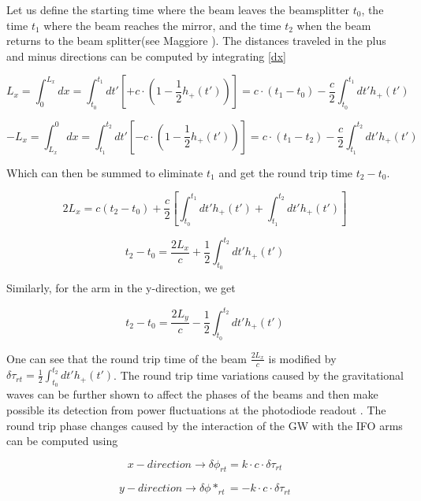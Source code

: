 Let us define the starting time where the beam leaves the beamsplitter $t_0$, the time $t_1$ where the beam reaches the mirror, and the time $t_2$ when the beam returns to the beam splitter(see Maggiore \cite[chapter 9]{Maggiore:2007ulw}). The distances traveled in the plus and minus directions can be computed by integrating \ref{dx}

\begin{equation}
L_{x}  = \int_0^{L_x} dx = \int_{t_0}^{t_1} dt' \left[+c \cdot\left(1-\frac{1}{2} h_+(t') \right)\right] = c\cdot(t_1-t_0) - \frac{c}{2} \int_{t_0}^{t_1} dt' h_+(t') 
\end{equation}

\begin{equation}
-L_{x}  = \int^0_{L_x} dx = \int_{t_1}^{t_2} dt' \left[-c \cdot\left(1-\frac{1}{2} h_+(t') \right)\right] = c\cdot(t_1-t_2) - \frac{c}{2} \int_{t_1}^{t_2} dt' h_+(t')
\end{equation}


Which can then be summed to eliminate $t_1$ and get the round trip time $t_2-t_0$.

\begin{equation}
2L_x = c(t_2 - t_0) + \frac{c}{2} \left[ \int_{t_0}^{t_1} dt' h_+(t') +  \int_{t_1}^{t_2} dt' h_+(t')\right]
\end{equation}

\begin{equation}
t_2 - t_0 = \frac{2L_x}{c} + \frac{1}{2} \int_{t_0}^{t_2} dt' h_+(t')
\end{equation}

Similarly, for the arm in the y-direction, we get

\begin{equation}
t_2 - t_0 = \frac{2L_y}{c} - \frac{1}{2} \int_{t_0}^{t_2} dt' h_+(t')
\end{equation}

One can see that the round trip time of the beam $\frac{2L_x}{c}$ is modified by $\delta \tau_{rt} = \frac{1}{2} \int_{t_0}^{t_2} dt' h_+(t')$. The round trip time variations caused by the gravitational waves can be further shown to affect the phases of the beams and then make possible its detection from power fluctuations at the photodiode readout \cite{Saulson:1995zi}. The round trip phase changes caused by the interaction of the GW with the IFO arms can be computed using 

\begin{equation}
x-direction \rightarrow \delta \phi_{rt} = k\cdot c \cdot \delta \tau_{rt}
\end{equation}

\begin{equation}
y-direction \rightarrow \delta \phi*_{rt} = - k\cdot c \cdot \delta \tau_{rt}
\end{equation}

